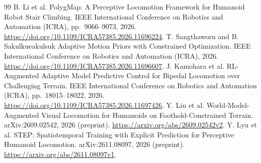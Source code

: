 \documentclass[11pt,a4paper]{article}
\begin{document}
\begin{thebibliography}{99}
 B. Li et al. PolygMap: A Perceptive Locomotion Framework for Humanoid Robot Stair Climbing. IEEE International Conference on Robotics and Automation (ICRA), pp.~9066--9073, 2026. \url{https://doi.org/10.1109/ICRA57385.2026.11696224}.
 T. Sangthaworn and B. Sakulkueakulsuk Adaptive Motion Priors with Constrained Optimization. IEEE International Conference on Robotics and Automation (ICRA), 2026. \url{https://doi.org/10.1109/ICRA57385.2026.11696607}.
 J. Kamohara et al. RL-Augmented Adaptive Model Predictive Control for Bipedal Locomotion over Challenging Terrain. IEEE International Conference on Robotics and Automation (ICRA), pp.~18015--18022, 2026. \url{https://doi.org/10.1109/ICRA57385.2026.11697426}.
 Y. Liu et al. World-Model-Augmented Visual Locomotion for Humanoids on Foothold-Constrained Terrain. arXiv:2609.02542, 2026 (preprint). \url{https://arxiv.org/abs/2609.02542v2}.
 Y. Lyu et al. STEP: Spatiotemporal Training with Explicit Prediction for Perceptive Humanoid Locomotion. arXiv:2611.08097, 2026 (preprint). \url{https://arxiv.org/abs/2611.08097v1}.
\end{thebibliography}
\end{document}
